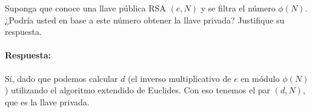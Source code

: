 
Suponga que conoce una llave pública RSA $(e,N)$ y se filtra el número $\phi(N)$. ¿Podría usted en base a este número obtener la llave privada? Justifique su respuesta.
\paragraph{Respuesta:} Sí, dado que podemos calcular $d$ (el inverso multiplicativo de $e$ en módulo $\phi(N)$) utilizando el algoritmo extendido de Euclides. Con eso tenemos el par $(d,N)$, que es la llave privada.
